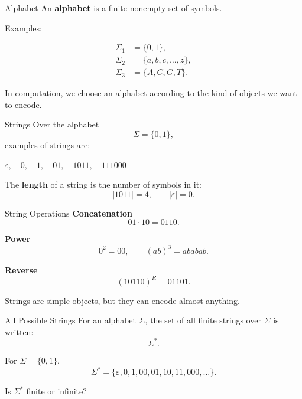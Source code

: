 \documentclass[10pt,aspectratio=169]{beamer}
\newcommand{\term}[1]{\textcolor{tocblue}{\textbf{#1}}}
\newcommand{\mathbox}[1]{%
\begin{center}
\colorbox{black!4}{\parbox{0.86\textwidth}{\centering #1}}
\end{center}}
\begin{document}
\begin{frame}{Alphabet}
An \term{alphabet} is a finite nonempty set of symbols.

\vspace{1.2em}

\pause
Examples:

\begin{align*}
\Sigma_1 &= \{0,1\}, \\
\Sigma_2 &= \{a,b,c,\ldots,z\}, \\
\Sigma_3 &= \{A,C,G,T\}.
\end{align*}

\pause
\vspace{0.5em}

In computation, we choose an alphabet according to the kind of objects we want to encode.
\end{frame}

\begin{frame}{Strings}
Over the alphabet
\[
\Sigma = \{0,1\},
\]
examples of strings are:

\mathbox{$\varepsilon,\quad 0,\quad 1,\quad 01,\quad 1011,\quad 111000$}

\pause
\vspace{0.5em}

The \term{length} of a string is the number of symbols in it:
\[
|1011| = 4, \qquad |\varepsilon| = 0.
\]
\end{frame}

\begin{frame}{String Operations}
\textbf{Concatenation}
\[
01 \cdot 10 = 0110.
\]

\pause
\textbf{Power}
\[
0^2 = 00, \qquad (ab)^3 = ababab.
\]

\pause
\textbf{Reverse}
\[
(10110)^R = 01101.
\]

\vspace{0.5em}
\pause
\begin{center}
Strings are simple objects, but they can encode almost anything.
\end{center}
\end{frame}

\begin{frame}{All Possible Strings}
For an alphabet $\Sigma$, the set of all finite strings over $\Sigma$ is written:
\[
\Sigma^*.
\]

\pause
For $\Sigma=\{0,1\}$,
\[
\Sigma^* = \{\varepsilon,0,1,00,01,10,11,000,\ldots\}.
\]

\pause
\vspace{0.5em}
\begin{center}
Is $\Sigma^*$ finite or infinite?
\end{center}
\end{frame}
\end{document}
